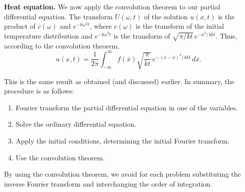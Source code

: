 \textbf{Heat equation.}  We now apply the convolution theorem to our partial differential equation.  The transform $\overline{U}(\omega,t)$ of the solution $u(x,t)$ is the product of $c(\omega)$ and $e^{-k\omega^2 t}$, where $c(\omega)$ is the transform of the initial temperature distribution and $e^{-k\omega^2 t}$ is the transform of $\sqrt{\pi/kt}\,e^{-x^2/4kt}$.  Thus, according to the convolution theorem,
\[
\boxed{u(x,t) = \frac{1}{2\pi}\int_{-\infty}^{\infty}f(\bar{x})\sqrt{\frac{\pi}{kt}}\,e^{-(x-\bar{x})^2/4kt}\,d\bar{x}.}
\]

This is the same result as obtained (and discussed) earlier.  In summary, the procedure is as follows:
\begin{enumerate}
\item Fourier transform the partial differential equation in one of the variables.
\item Solve the ordinary differential equation.
\item Apply the initial conditions, determining the initial Fourier transform.
\item Use the convolution theorem.
\end{enumerate}
By using the convolution theorem, we avoid for each problem substituting the inverse Fourier transform and interchanging the order of integration.

